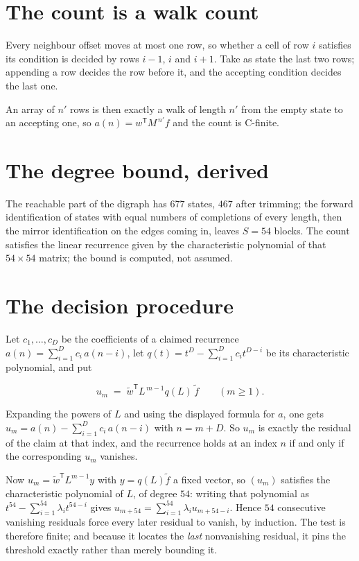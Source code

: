 \documentclass[11pt]{article}
\theoremstyle{definition}
\begin{document}
\section{The count is a walk count}

Every neighbour offset moves at most one row, so whether a cell of row $i$ satisfies its condition is decided by rows $i-1$, $i$ and $i+1$. Take as state the last two rows; appending a row decides the row before it, and the accepting condition decides the last one.

An array of $n'$ rows is then exactly a walk of length $n'$ from the empty state to an accepting one, so $a(n) = w^{\mathsf T}M^{\,n'}f$ and the count is C-finite.

\section{The degree bound, derived}

The reachable part of the digraph has $677$ states, $467$ after trimming; the forward identification of states with equal numbers of completions of every length, then the mirror identification on the edges coming in, leaves $S = 54$ blocks. The count satisfies the linear recurrence given by the characteristic polynomial of that $54\times54$ matrix; the bound is computed, not assumed.

\section{The decision procedure}

Let $c_1,\dots,c_D$ be the coefficients of a claimed recurrence $a(n) = \sum_{i=1}^{D} c_i\,a(n-i)$, let $q(t) = t^{D} - \sum_{i=1}^{D} c_i t^{D-i}$ be its characteristic polynomial, and put

\[u_m \;=\; \tilde w^{\mathsf T} L^{\,m-1} q(L)\,\tilde f \qquad (m \ge 1).\]

Expanding the powers of $L$ and using the displayed formula for $a$, one gets $u_m = a(n) - \sum_{i=1}^{D} c_i\,a(n-i)$ with $n = m + D$. So $u_m$ is exactly the residual of the claim at that index, and the recurrence holds at an index $n$ if and only if the corresponding $u_m$ vanishes.

Now $u_m = \tilde w^{\mathsf T} L^{m-1} y$ with $y = q(L)\tilde f$ a fixed vector, so $(u_m)$ satisfies the characteristic polynomial of $L$, of degree $54$: writing that polynomial as $t^{54} - \sum_{i=1}^{54} \lambda_i t^{54-i}$ gives $u_{m+54} = \sum_{i=1}^{54} \lambda_i u_{m+54-i}$. Hence $54$ consecutive vanishing residuals force every later residual to vanish, by induction. The test is therefore finite; and because it locates the {\itshape last} nonvanishing residual, it pins the threshold exactly rather than merely bounding it.
\end{document}
